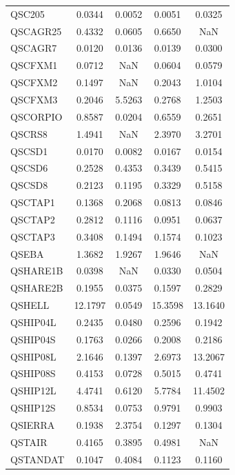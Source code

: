 \begin{longtable}{lcccc}
QSC205   &   0.0344 &   0.0052 &     0.0051 &   0.0325 \\
QSCAGR25 &   0.4332 &   0.0605 &     0.6650 &      NaN \\
QSCAGR7  &   0.0120 &   0.0136 &     0.0139 &   0.0300 \\
QSCFXM1  &   0.0712 &      NaN &     0.0604 &   0.0579 \\
QSCFXM2  &   0.1497 &      NaN &     0.2043 &   1.0104 \\
QSCFXM3  &   0.2046 &   5.5263 &     0.2768 &   1.2503 \\
QSCORPIO &   0.8587 &   0.0204 &     0.6559 &   0.2651 \\
QSCRS8   &   1.4941 &      NaN &     2.3970 &   3.2701 \\
QSCSD1   &   0.0170 &   0.0082 &     0.0167 &   0.0154 \\
QSCSD6   &   0.2528 &   0.4353 &     0.3439 &   0.5415 \\
QSCSD8   &   0.2123 &   0.1195 &     0.3329 &   0.5158 \\
QSCTAP1  &   0.1368 &   0.2068 &     0.0813 &   0.0846 \\
QSCTAP2  &   0.2812 &   0.1116 &     0.0951 &   0.0637 \\
QSCTAP3  &   0.3408 &   0.1494 &     0.1574 &   0.1023 \\
QSEBA    &   1.3682 &   1.9267 &     1.9646 &      NaN \\
QSHARE1B &   0.0398 &      NaN &     0.0330 &   0.0504 \\
QSHARE2B &   0.1955 &   0.0375 &     0.1597 &   0.2829 \\
QSHELL   &  12.1797 &   0.0549 &    15.3598 &  13.1640 \\
QSHIP04L &   0.2435 &   0.0480 &     0.2596 &   0.1942 \\
QSHIP04S &   0.1763 &   0.0266 &     0.2008 &   0.2186 \\
QSHIP08L &   2.1646 &   0.1397 &     2.6973 &  13.2067 \\
QSHIP08S &   0.4153 &   0.0728 &     0.5015 &   0.4741 \\
QSHIP12L &   4.4741 &   0.6120 &     5.7784 &  11.4502 \\
QSHIP12S &   0.8534 &   0.0753 &     0.9791 &   0.9903 \\
QSIERRA  &   0.1938 &   2.3754 &     0.1297 &   0.1304 \\
QSTAIR   &   0.4165 &   0.3895 &     0.4981 &      NaN \\
QSTANDAT &   0.1047 &   0.4084 &     0.1123 &   0.1160 \\

\end{longtable}
